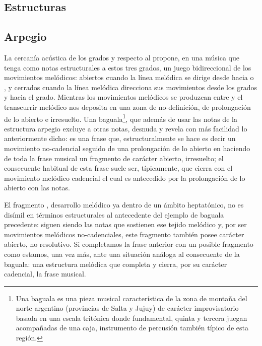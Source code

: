 \documentclass[a4paper,10pt]{article}
\begin{document}
\begin{multicols}{2}
\section{Estructuras}\label{sec:estructuras}
  \subsection{Arpegio}\label{subsec:arpegio}
  La cercanía acústica de los grados  y  respecto al  propone, en una música que tenga como notas estructurales a estos tres grados, un juego bidireccional de los movimientos melódicos: abiertos cuando la línea melódica se dirige desde  hacia  o , y cerrados cuando la línea melódica direcciona sus movimientos desde los grados  y  hacia el  grado. Mientras los movimientos melódicos se produzcan entre  y  el transcurrir melódico nos deposita en una zona de no-definición, de prolongación de lo abierto e irresuelto. Una baguala\footnote{Una baguala es una pieza musical característica de la zona de montaña del norte argentino (provincias de Salta y Jujuy) de carácter improvisatorio basada en una escala tritónica donde fundamental, quinta y tercera juegan acompañadas de una caja, instrumento de percusión también típico de esta región.}, que además de usar las notas de la estructura arpegio excluye a otras notas, desnuda y revela con más facilidad lo anteriormente dicho:  es una frase que, estructuralmente se hace  es decir un movimiento no-cadencial  seguido de una prolongación de lo abierto en  haciendo de toda la frase musical un fragmento de carácter abierto, irresuelto; el consecuente habitual de esta frase suele ser, típicamente,  que cierra con el movimiento melódico cadencial  el cual es antecedido por la prolongación de lo abierto con las notas\hbox{.}

  El fragmento , desarrollo melódico ya dentro de un ámbito heptatónico, no es disímil en términos estructurales al antecedente del ejemplo de baguala precedente:  siguen siendo las notas que sostienen ese tejido melódico y, por ser movimientos melódicos no-cadenciales, este fragmento también posee carácter abierto, no resolutivo. Si completamos la frase anterior con un posible fragmento como  estamos, una vez más, ante una situación análoga al consecuente de la baguala: una estructura melódica  que completa y cierra, por su carácter cadencial, la frase musical.


\end{multicols}
\end{document}
